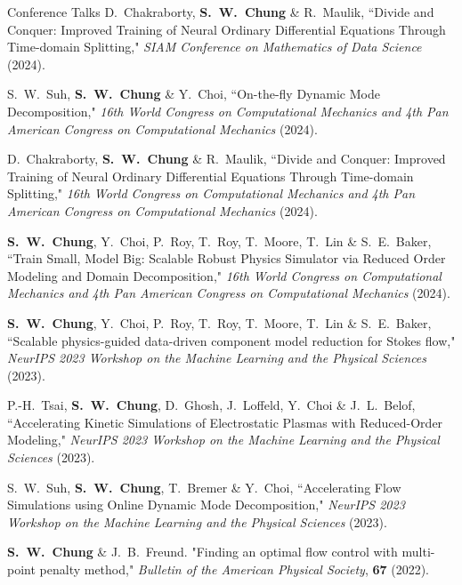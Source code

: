 \documentclass{resume} %
\begin{document}
\begin{rSection}{Conference Talks}
D.\ Chakraborty, \textbf{S.\ W.\ Chung} \& R.\ Maulik,
``Divide and Conquer: Improved Training of Neural Ordinary Differential Equations Through Time-domain Splitting,"
\textit{SIAM Conference on Mathematics of Data Science} (2024).
\par
S.\ W.\ Suh, \textbf{S.\ W.\ Chung} \& Y.\ Choi,
``On-the-fly Dynamic Mode Decomposition,"
\textit{16th World Congress on Computational Mechanics and 4th Pan American Congress on Computational Mechanics} (2024).
\par
D.\ Chakraborty, \textbf{S.\ W.\ Chung} \& R.\ Maulik,
``Divide and Conquer: Improved Training of Neural Ordinary Differential Equations Through Time-domain Splitting,"
\textit{16th World Congress on Computational Mechanics and 4th Pan American Congress on Computational Mechanics} (2024).
\par
\textbf{S.\ W.\ Chung}, Y.\ Choi, P.\ Roy, T.\ Roy, T.\ Moore, T.\ Lin \& S.\ E.\ Baker,
``Train Small, Model Big: Scalable Robust Physics Simulator via Reduced Order Modeling and Domain Decomposition,"
\textit{16th World Congress on Computational Mechanics and 4th Pan American Congress on Computational Mechanics} (2024).
\par
\textbf{S.\ W.\ Chung}, Y.\ Choi, P.\ Roy, T.\ Roy, T.\ Moore, T.\ Lin \& S.\ E.\ Baker,
``Scalable physics-guided data-driven component model reduction for Stokes flow,"
\textit{NeurIPS 2023 Workshop on the Machine Learning and the Physical Sciences} (2023).
\par
P.-H.\ Tsai, \textbf{S.\ W.\ Chung}, D.\ Ghosh, J.\ Loffeld, Y.\ Choi \& J.\ L.\ Belof,
``Accelerating Kinetic Simulations of Electrostatic Plasmas with Reduced-Order Modeling,"
\textit{NeurIPS 2023 Workshop on the Machine Learning and the Physical Sciences} (2023).
\par
S.\ W.\ Suh, \textbf{S.\ W.\ Chung}, T.\ Bremer \& Y.\ Choi,
``Accelerating Flow Simulations using Online Dynamic Mode Decomposition,"
\textit{NeurIPS 2023 Workshop on the Machine Learning and the Physical Sciences} (2023).
\par

\textbf{S.\ W.\ Chung} \& J.\ B.\ Freund. "Finding an optimal flow control with multi-point penalty method,"
\textit{Bulletin of the American Physical Society}, \textbf{67} (2022).


\end{rSection}
\end{document}
